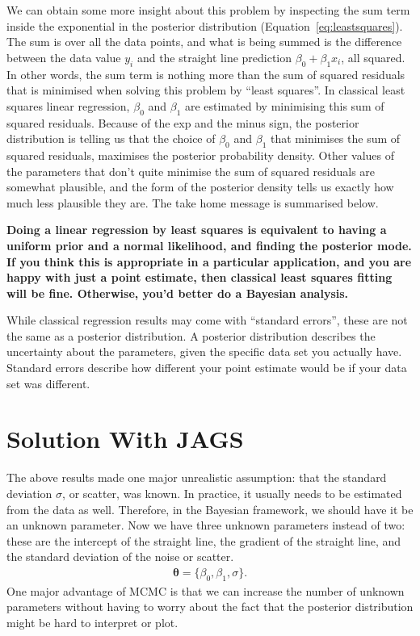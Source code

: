 We can obtain some more insight about this problem by inspecting the
sum term inside the exponential in the posterior distribution
(Equation~\ref{eq:leastsquares}). The sum is over all the data points, and
what is being summed is the difference between the data value $y_i$ and the
straight line prediction $\beta_0 + \beta_1 x_i$, all squared.
In other words, the sum term is nothing more than the sum of squared
residuals that is minimised when solving this problem by ``least squares''.
In classical least squares linear regression, $\beta_0$ and $\beta_1$ are
estimated by minimising this sum of squared residuals. Because of the exp and
the minus sign, the posterior distribution is telling us that the choice of
$\beta_0$ and $\beta_1$ that minimises the sum of squared residuals, maximises
the posterior probability density. Other values of the parameters that
don't quite minimise the sum of squared residuals are somewhat plausible, and
the form of the posterior density tells us exactly how much less plausible they
are. The take home message is summarised below.

\begin{framed}
{\bf Doing a linear regression by least squares is equivalent to having a
uniform prior and a normal likelihood, and finding the posterior mode.
If you think this is appropriate in a particular application, and you are happy
with just a point estimate, then classical
least squares fitting will be fine. Otherwise, you'd better do a Bayesian analysis.}
\end{framed}

While classical regression results may come with ``standard errors'', these are
not the same as a posterior distribution. A posterior distribution describes the
uncertainty about the parameters, given the specific data set you actually have.
Standard errors describe how different your point estimate would be if your data
set was different.

\section{Solution With JAGS}
The above results made one major unrealistic assumption: that the standard
deviation $\sigma$, or scatter, was known. In practice, it usually needs to be
estimated from the data as well. Therefore, in the Bayesian framework, we should
have it be an unknown parameter. Now we have three unknown parameters instead
of two: these are the intercept of the straight line, the gradient of
the straight line, and the standard deviation of the noise or scatter.
\begin{eqnarray}
\boldsymbol{\theta} = \{\beta_0, \beta_1, \sigma\}.
\end{eqnarray}
One major advantage of MCMC is that we can increase the number of unknown parameters
without having to worry about the fact that the posterior distribution might
be hard to interpret or plot.

